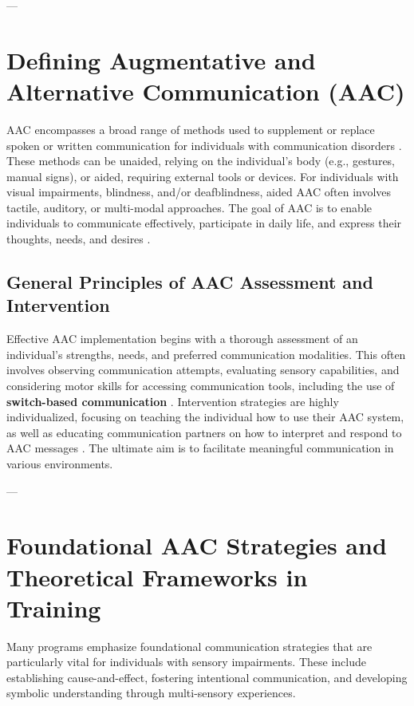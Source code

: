 ---

\section{Defining Augmentative and Alternative Communication (AAC)}\label{sec:defining-aac}

AAC encompasses a broad range of methods used to supplement or replace spoken or written communication for individuals with communication disorders  \cite{ASHA}. These methods can be unaided, relying on the individual’s body (e.g., gestures, manual signs), or aided, requiring external tools or devices. For individuals with visual impairments, blindness, and/or deafblindness, aided AAC often involves tactile, auditory, or multi-modal approaches. The goal of AAC is to enable individuals to communicate effectively, participate in daily life, and express their thoughts, needs, and desires  \cite{ASHA}.

\subsection{General Principles of AAC Assessment and Intervention}\label{subsec:aac-principles}

Effective AAC implementation begins with a thorough assessment of an individual's strengths, needs, and preferred communication modalities. This often involves observing communication attempts, evaluating sensory capabilities, and considering motor skills for accessing communication tools, including the use of \textbf{switch-based communication}  \cite{ASHA}. Intervention strategies are highly individualized, focusing on teaching the individual how to use their AAC system, as well as educating communication partners on how to interpret and respond to AAC messages  \cite{ASHA}. The ultimate aim is to facilitate meaningful communication in various environments.

---

\section{Foundational AAC Strategies and Theoretical Frameworks in Training}\label{sec:aac-strategies}

Many programs emphasize foundational communication strategies that are particularly vital for individuals with sensory impairments. These include establishing cause-and-effect, fostering intentional communication, and developing symbolic understanding through multi-sensory experiences.

